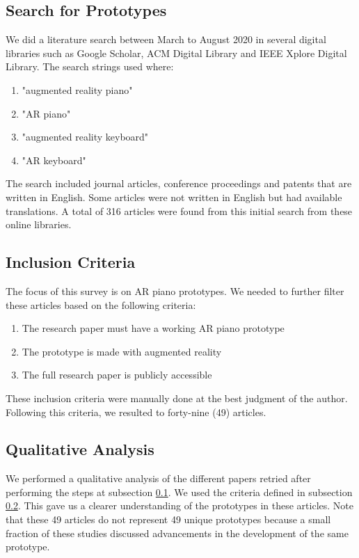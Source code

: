 \documentclass[manuscript,screen]{acmart}
\begin{document}
\subsection{Search for Prototypes}
\label{subsec: search}
We did a literature search between March to August 2020 in several digital libraries such as Google Scholar, ACM Digital Library and IEEE Xplore Digital Library. The search strings used where:
\begin{enumerate}
    \item "augmented reality piano"
    \item "AR piano"
    \item "augmented reality keyboard"
    \item "AR keyboard"
\end{enumerate}
The search included journal articles, conference proceedings and patents that are written in English. Some articles were not written in English but had available translations. A total of 316 articles were found from this initial search from these online libraries. 
\subsection{Inclusion Criteria}
\label{subsec: criteria}
The focus of this survey is on AR piano prototypes. We needed to further filter these articles based on the following criteria:
\begin{enumerate}
    \item The research paper must have a working AR piano prototype
    \item The prototype is made with augmented reality
    \item The full research paper is publicly accessible 
\end{enumerate}
These inclusion criteria were manually done at the best judgment of the author. Following this criteria, we resulted to forty-nine (49) articles. 
\subsection{Qualitative Analysis}
We performed a qualitative analysis of the different papers retried after performing the steps at subsection \ref{subsec: search}. We used the criteria defined in subsection \ref{subsec: criteria}. This gave us a clearer understanding of the prototypes in these articles. Note that these 49 articles do not represent 49 unique prototypes because a small fraction of these studies discussed advancements in the development of the same prototype. \\
\end{document}
